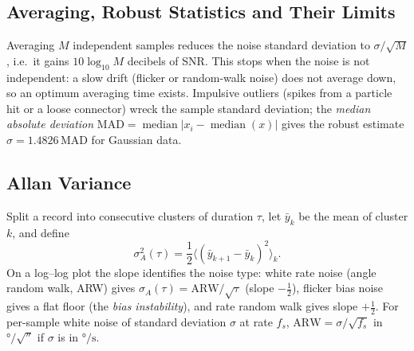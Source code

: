 \documentclass[11pt,a4paper]{article}
\begin{document}
\subsection{Averaging, Robust Statistics and Their Limits}
Averaging $M$ independent samples reduces the noise standard deviation to $\sigma/\sqrt M$, i.e.\ it gains $10\log_{10}M$ decibels of SNR. This stops when the noise is not independent: a slow drift (flicker or random-walk noise) does not average down, so an optimum averaging time exists. Impulsive outliers (spikes from a particle hit or a loose connector) wreck the sample standard deviation; the \emph{median absolute deviation} $\mathrm{MAD}=\operatorname{median}|x_i-\operatorname{median}(x)|$ gives the robust estimate $\hat\sigma=1.4826\,\mathrm{MAD}$ for Gaussian data.

\subsection{Allan Variance}
Split a record into consecutive clusters of duration $\tau$, let $\bar y_k$ be the mean of cluster $k$, and define
\begin{equation}
  \sigma_A^2(\tau)=\frac12\Big\langle(\bar y_{k+1}-\bar y_k)^2\Big\rangle_k .
  \label{eq:allan}
\end{equation}
On a log--log plot the slope identifies the noise type: white rate noise (angle random walk, ARW) gives $\sigma_A(\tau)=\mathrm{ARW}/\sqrt\tau$ (slope $-\tfrac12$), flicker bias noise gives a flat floor (the \emph{bias instability}), and rate random walk gives slope $+\tfrac12$. For per-sample white noise of standard deviation $\sigma$ at rate $f_s$, $\mathrm{ARW}=\sigma/\sqrt{f_s}$ in $\si{\degree\per\sqrt\second}$ if $\sigma$ is in $\si{\degree\per\second}$.
\end{document}
